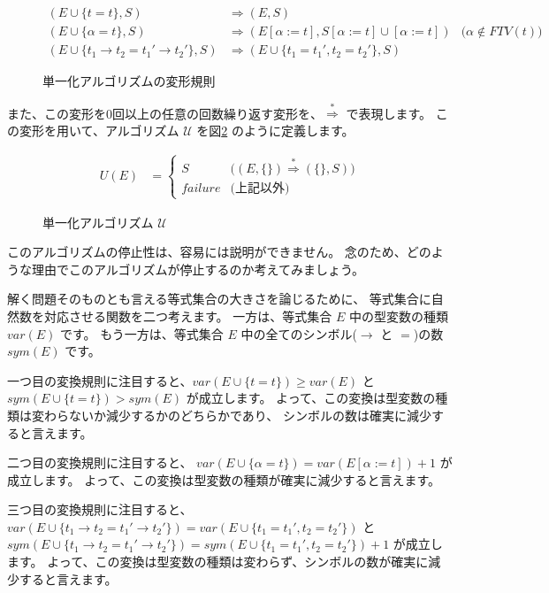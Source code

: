 \begin{figure}[htbp]
  \begin{align*}
    (E \cup \{t = t\}, S)
      &\Longrightarrow (E, S) \\
    (E \cup \{\alpha = t\}, S)
      &\Longrightarrow (E[\alpha := t], S[\alpha := t] \cup [\alpha := t])
      &\text{($\alpha \notin \mathit{FTV(t)}$)}\\
    (E \cup \{t_1 \to t_2 = t_1' \to t_2'\}, S)
      &\Longrightarrow (E \cup \{t_1 = t_1', t_2 = t_2'\}, S)
  \end{align*}
  \caption{単一化アルゴリズムの変形規則}
  \label{fig:unification-trans}
\end{figure}

また、この変形を0回以上の任意の回数繰り返す変形を、$\stackrel{*}{\Longrightarrow}$ で表現します。
この変形を用いて、アルゴリズム $\mathcal U$ を図\ref{fig:algorithm-u} のように定義します。

\begin{figure}[htbp]
  \begin{align*}
    U(E) &=
    \begin{cases}
      S & \text{($(E, \{\}) \stackrel{*}{\Longrightarrow} (\{\}, S)$)} \\
      \mathit{failure} & \text{(上記以外)}
    \end{cases}
  \end{align*}
  \caption{単一化アルゴリズム $\mathcal U$}
  \label{fig:algorithm-u}
\end{figure}

このアルゴリズムの停止性は、容易には説明ができません。
念のため、どのような理由でこのアルゴリズムが停止するのか考えてみましょう。

解く問題そのものとも言える等式集合の大きさを論じるために、
等式集合に自然数を対応させる関数を二つ考えます。
一方は、等式集合 $E$ 中の型変数の種類 $\mathit{var}(E)$ です。
もう一方は、等式集合 $E$ 中の全てのシンボル($\to$ と $=$)の数 $\mathit{sym}(E)$ です。

一つ目の変換規則に注目すると、$\mathit{var}(E \cup \{t = t\}) \ge \mathit{var}(E)$ と
$\mathit{sym}(E \cup \{t = t\}) > \mathit{sym}(E)$ が成立します。
よって、この変換は型変数の種類は変わらないか減少するかのどちらかであり、
シンボルの数は確実に減少すると言えます。

二つ目の変換規則に注目すると、
$\mathit{var}(E \cup \{\alpha = t\}) = \mathit{var}(E[\alpha := t])+1$ が成立します。
よって、この変換は型変数の種類が確実に減少すると言えます。

三つ目の変換規則に注目すると、
$\mathit{var}(E \cup \{t_1 \to t_2 = t_1' \to t_2'\}) =
 \mathit{var}(E \cup \{t_1 = t_1', t_2 = t_2'\})$
と
$\mathit{sym}(E \cup \{t_1 \to t_2 = t_1' \to t_2'\}) =
 \mathit{sym}(E \cup \{t_1 = t_1', t_2 = t_2'\})+1$
が成立します。
よって、この変換は型変数の種類は変わらず、シンボルの数が確実に減少すると言えます。

